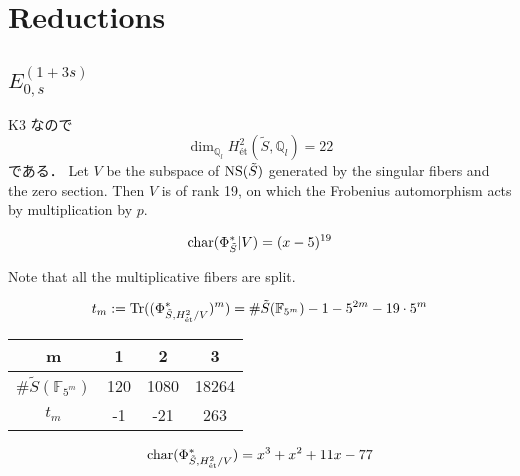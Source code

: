 \documentclass[main]{subfiles}
\begin{document}
\chapter{Reductions}
\section{$E_{0,s}^{(1 + 3s)}$}

K3 なので
\begin{equation}
    \dim_{\mathbb{Q}_{l}} H_{\text{\'et}}^{2}(\tilde{S}, \mathbb{Q}_{l}) = 22
\end{equation}
である．
Let $V$ be the subspace of $\operatorname{NS}(\tilde{S})$ generated by the singular fibers and the zero section.
Then $V$ is of rank 19, on which the Frobenius automorphism acts by multiplication by $p$.

\begin{equation}
    \operatorname{char} (\Phi_{\tilde{S}}^{*} | V) = (x - 5)^{19}
\end{equation}

Note that all the multiplicative fibers are split.

\begin{equation}
    t_{m} := \operatorname{Tr}((\Phi_{\tilde{S},H_{\text{\'et}}^{2} / V}^{*})^{m}) = \# \tilde{S}(\mathbb{F}_{5^{m}}) - 1 - 5^{2m} - 19 \cdot 5^{m}
\end{equation}

\begin{table}[h]
    \centering
    \begin{tabular}{|c|c|c|c|}
        \hline
        m                                & 1   & 2    & 3     \\
        \hline
        $\# \tilde{S}(\mathbb{F}_{5^m})$ & 120 & 1080 & 18264 \\
        \hline
        $t_m$                            & -1  & -21  & 263   \\
        \hline
    \end{tabular}
    \label{tab:sample}
\end{table}

\begin{equation}
    \operatorname{char}(\Phi_{\tilde{S},H_{\text{\'et}}^{2} / V}^{*}) = x^{3} + x^{2} + 11 x - 77
\end{equation}
\end{document}
